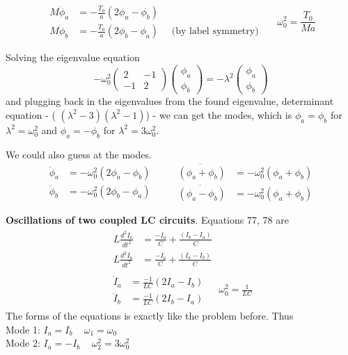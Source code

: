 \documentclass[twoside,10pt]{amsart}
\newcommand{\problemhead}[1]
  {\smallskip
   \noindent{\large\bf Problem #1.}
   \smallskip}
\begin{document}
\[
\begin{aligned}
  M \ddot{\phi}_a & = - \frac{T_0}{a} (2 \phi_a - \phi_b) \\
  M \ddot{\phi}_b & = -\frac{T_0}{a} ( 2 \phi_b - \phi_a) \quad \text{ (by label symmetry) }  
\end{aligned}
\quad \, \omega_0^2 = \frac{T_0}{Ma}
\]

Solving the eigenvalue equation
\[
-\omega_0^2 \left( \begin{matrix} 2 & - 1 \\ -1 & 2 \end{matrix} \right) \left( \begin{matrix} \phi_a \\ \phi_b \end{matrix} \right) = -\lambda^2 \left( \begin{matrix} \phi_a \\ \phi_b \end{matrix} \right) 
\]
and plugging back in the eigenvalues from the found eigenvalue, determinant equation - ( $(\lambda^2 - 3)(\lambda^2 - 1 ) $) - we can get the modes, which is $\phi_a = \phi_b$ for $\lambda^2 = \omega_0^2$ and $\phi_a = -\phi_b$ for $\lambda^2 = 3 \omega_0^2$.  

We could also guess at the modes.  
\[
\begin{aligned}
  \ddot{\phi}_a & = -\omega_0^2 (2 \phi_a - \phi_b) \\
  \ddot{\phi}_b & = -\omega_0^2 (2 \phi_b - \phi_a)
\end{aligned} \quad \quad
\begin{aligned}
  \ddot{ (\phi_a + \phi_b) } & = -\omega_0^2 (\phi_a + \phi_b) \\
  \ddot{ (\phi_a - \phi_b) } & = -\omega_0^2 (\phi_a + \phi_b) 
\end{aligned}
\]

\problemhead{1.21} \textbf{ Oscillations of two coupled LC circuits}.  Equations 77, 78 are
\[
\begin{gathered}
\begin{aligned}
  L \frac{d^2 I_a}{dt^2} & = \frac{-I_a}{C} + \frac{ (I_b - I_a)}{ C } \\
  L \frac{d^2 I_b}{dt^2} & = \frac{-I_b}{C} + \frac{ (I_a - I_b)}{ C } 
\end{aligned} \\
\begin{aligned}
  \ddot{I}_a & = \frac{-1}{LC} ( 2 I_a - I_b ) \\
  \ddot{I}_b & = \frac{-1}{LC} (2 I_b - I_a ) 
\end{aligned} \quad \, \omega_0^2 = \frac{1}{LC} 
\end{gathered}
\]
The forms of the equations is exactly like the problem before.  Thus \\
Mode 1: $I_a = I_b \quad \, \omega_1 = \omega_0$ \\
Mode 2: $I_a = -I_b \quad \, \omega_2^2 = 3\omega_0^2$ 
\end{document}
